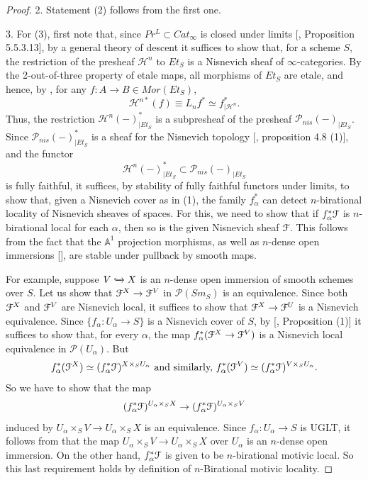 \begin{proof}
2. Statement (2) follows from the first one.

3. For (3), first note that, since $Pr^L\subset Cat_\infty$ is closed under limits [\cite{lurie2009higher}, Proposition 5.5.3.13], by a general theory of descent it suffices to show that, for a scheme $S$, the restriction of the presheaf $\mathcal{H}^n$ to $Et_S$ is a Nisnevich sheaf of $\infty$-categories. By the 2-out-of-three property of etale maps, all morphisms of $Et_S$ are etale, and hence, by , for any $f:A\to B\in Mor(Et_S)$, $$\mathcal{H}^{n*}(f)\equiv L_{n}f^*\simeq f^*_{|\mathcal{H}^{n}}.$$ Thus, the restriction $\mathcal{H}^{n}(-)^*_{|Et_S}$ is a subpresheaf of the presheaf $\mathcal{P}_{nis}(-)_{|Et_S}$. Since $\mathcal{P}_{nis}(-)^*_{|Et_S}$ is a sheaf for the Nisnevich topology [\cite{hoyois2017six}, proposition 4.8 (1)], and the functor $$\mathcal{H}^{n}(-)^*_{|Et_S}\subset \mathcal{P}_{nis}(-)_{|Et_S}$$ is fully faithful, it suffices, by stability of fully faithful functors under limits, to show that, given a Nisnevich cover as in (1), the family $f_{\alpha}^{ *}$ can detect $n$-birational locality of Nisnevich sheaves of spaces. For this, we need to show that if $f_{\alpha}^{ *} \EuScript{F}$ is $n$-birational local for each $\alpha$, then so is the given Nisnevich sheaf $\EuScript{\EuScript{F}}$. This follows from the fact that the $\mathbb{A}^1$ projection morphisms, as well as $n$-dense open immersions [], are stable under pullback by smooth maps. 

For example, suppose $V\xhookrightarrow{}X$ is an $n$-dense open immersion of smooth schemes over $S$. Let us show that $\EuScript{F}^X\to \EuScript{F}^V$ in $\mathcal{P}(Sm_S)$ is an equivalence. Since both $\EuScript{F}^X$ and $\EuScript{F}^V$ are Nisnevich local, it suffices to show that $\EuScript{F}^X\to \EuScript{F}^U$ is a Nisnevich equivalence. Since $\{f_\alpha:U_\alpha\to S\}$ is a Nisnevich cover of $S$, by [\cite{hoyois2017six}, Proposition (1)] it suffices to show that, for every $\alpha$, the map $f_\alpha^{*}(\EuScript{F}^X\to \EuScript{F}^V)$ is a Nisnevich local equivalence in $\mathcal{P}(U_\alpha)$. But $$f_\alpha^*(\EuScript{F}^X)\simeq (f_\alpha^*\EuScript{F})^{X\times_SU_\alpha}\text{ and similarly, }f_\alpha^*(\EuScript{F}^V)\simeq (f_\alpha^*\EuScript{F})^{V\times_SU_\alpha}.$$ So we have to show that the map $$(f_\alpha^*\EuScript{F})^{U_\alpha\times_SX}\to(f_\alpha^*\EuScript{F})^{U_\alpha\times_S V} $$ induced by $U_\alpha\times_SV\to U_\alpha\times_SX$ is an equivalence. Since $f_\alpha : U_\alpha\to S$ is UGLT, it follows from  that the map $U_\alpha\times_SV\to U_\alpha\times_SX$ over $U_\alpha$ is an $n$-dense open immersion. On the other hand, $f_\alpha^*\EuScript{F}$ is given to be $n$-birational motivic local. So this last requirement holds by definition of $n$-Birational motivic locality.
\end{proof}
